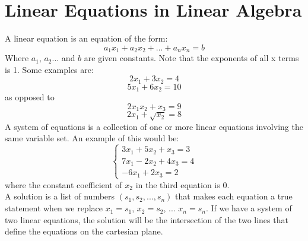 \documentclass[nobib]{tufte-handout}
\begin{document}
\section{Linear Equations in Linear Algebra}
A linear equation is an equation of the form:
\begin{equation*}
    a_1x_1+a_2x_2+...+a_nx_n=b
\end{equation*}
Where $a_1$, $a_2$... and $b$ are given constants.
Note that the exponents of all x terms is 1.
Some examples are:
\begin{equation*}
    2x_1+3x_2=4
\end{equation*}
\begin{equation*}
    5x_1+6x_2=10
\end{equation*}
as opposed to
\begin{equation*}
    2x_1x_2+x_3=9
\end{equation*}
\begin{equation*}
    2x_1+\sqrt{x_2}=8
\end{equation*}
A system of equations is a collection of one or more linear equations involving the same variable set. 
An example of this would be:
$$ \begin{cases}
3x_1 + 5x_2 + x_3 = 3\\
7x_1 - 2x_2 + 4x_3 = 4\\
-6x_1 + 2x_3 = 2
\end{cases} $$
where the constant coefficient of $x_2$ in the third equation is 0.\\
A solution is a list of numbers $(s_1, s_2, ..., s_n)$ that makes each equation a true statement when we replace $x_1=s_1$, $x_2=s_2$, ... $x_n=s_n$.
If we have a system of two linear equations, the solution will be the intersection of the two lines that define the equations on the cartesian plane.\\
\begin{center}
    
\end{center}
\end{document}
